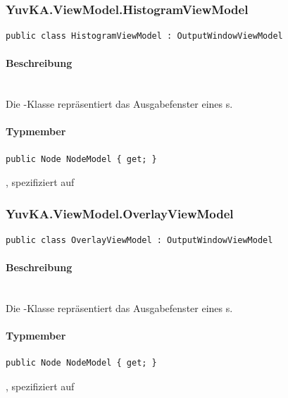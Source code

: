 \subsubsection{YuvKA.ViewModel.HistogramViewModel}

\begin{verbatim}
public class HistogramViewModel : OutputWindowViewModel
\end{verbatim}

\paragraph{Beschreibung}~\\
Die -Klasse repräsentiert das Ausgabefenster eines s.

\paragraph{Typmember}
\begin{itemize}

	\begin{verbatim}
public Node NodeModel { get; }
	\end{verbatim}
	, spezifiziert auf 

\end{itemize}

\subsubsection{YuvKA.ViewModel.OverlayViewModel}

\begin{verbatim}
public class OverlayViewModel : OutputWindowViewModel
\end{verbatim}

\paragraph{Beschreibung}~\\
Die -Klasse repräsentiert das Ausgabefenster eines s.

\paragraph{Typmember}
\begin{itemize}

	\begin{verbatim}
public Node NodeModel { get; }
	\end{verbatim}
	, spezifiziert auf 

\end{itemize}

